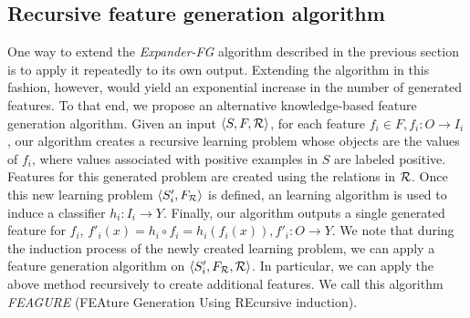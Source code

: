 \documentclass[letterpaper]{article} %
\theoremstyle{definition}
\begin{document}
\subsection{Recursive feature generation algorithm}
\label{algorithm_section}
One way to extend the \emph{Expander-FG} algorithm described in the previous section is to apply it repeatedly to its own output.
Extending the algorithm in this fashion, however, would yield an exponential increase in the number of generated features.
To that end, we propose an alternative knowledge-based feature generation algorithm. Given an input $\langle S,F,{\cal R} \rangle$, for each feature $f_i\in F, f_i:O\rightarrow I_i$, our algorithm creates a recursive learning problem whose objects are the values of $f_i$, where values associated with positive examples in $S$ are labeled positive. %
Features for this generated problem are created using the relations in ${\cal R}$. Once this new learning problem $\langle S'_i,F_{\cal R}\rangle$ is defined, an learning algorithm is used to induce a classifier $h_i:I_i\rightarrow Y$. Finally, our algorithm outputs a single generated feature for $f_i$, $f'_i(x)=h_i\circ f_i=h_i(f_i(x)), f'_i:O\rightarrow Y$.
We note that during the induction process of the newly created learning problem, we can apply a feature generation algorithm on $\langle S'_i,F_{\cal R},{\cal R} \rangle$. In particular, we can apply the above method recursively to create additional features. We call this algorithm \emph{FEAGURE} (FEAture Generation Using REcursive induction).

\end{document}
